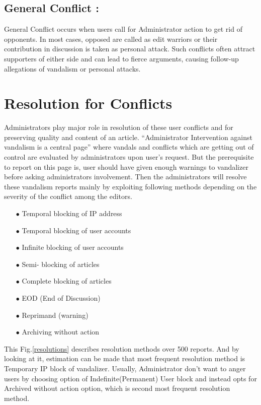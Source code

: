 \documentclass[12pt]{article}
\begin{document}
\subsection*{General Conflict :}
General Conflict occurs when users call for Administrator action to get rid of opponents. In most cases, opposed are called as edit warriors or their contribution in discussion is taken as personal attack. Such conflicts often attract supporters of either side and can lead to fierce arguments, causing follow-up allegations of vandalism or personal attacks.
\section{Resolution for Conflicts}
Administrators play major role in resolution of these user conflicts and for preserving quality and content of an article. “Administrator Intervention against vandalism is a central page” where vandals and conflicts which are getting out of control are evaluated by administrators upon user’s request.  But the prerequisite to report on this page is, user should have given enough warnings to vandalizer before asking administrators involvement. Then the administrators will resolve these vandalism reports mainly by exploiting following methods\cite{main} depending on the severity of the conflict among the editors.
\begin{itemize}
\item[$\bullet$ ]Temporal blocking of IP address
\item[$\bullet$ ]Temporal blocking of user accounts
\item[$\bullet$ ]Infinite blocking of user accounts
\item[$\bullet$ ]Semi- blocking of articles
\item[$\bullet$ ]Complete blocking of articles
\item[$\bullet$ ]EOD (End of Discussion)
\item[$\bullet$ ]Reprimand (warning)
\item[$\bullet$ ]Archiving without action 
\end{itemize}
This Fig.\ref{resolutions} describes resolution methods over 500 reports. And by looking at it, estimation can be made that most frequent resolution method is Temporary IP block of vandalizer. Usually, Administrator don't want to anger users by choosing option of Indefinite(Permanent) User block and instead opts for Archived without action option, which is second most frequent resolution method. \\
\end{document}
